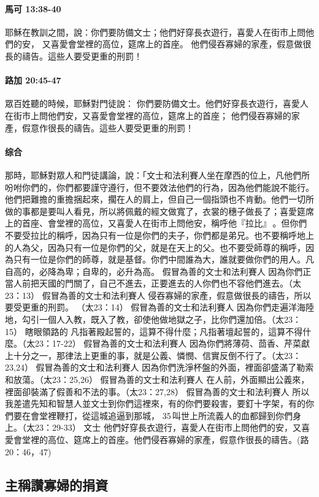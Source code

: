 \paragraph{馬可 13:38-40}
耶穌在教訓之間，說：你們要防備文士；他們好穿長衣遊行，喜愛人在街市上問他們的安，
又喜愛會堂裡的高位，筵席上的首座。
他們侵吞寡婦的家產，假意做很長的禱告。這些人要受更重的刑罰！
\paragraph{路加 20:45-47}
眾百姓聽的時候，耶穌對門徒說：
你們要防備文士。他們好穿長衣遊行，喜愛人在街市上問他們安，又喜愛會堂裡的高位，筵席上的首座；
他們侵吞寡婦的家產，假意作很長的禱告。這些人要受更重的刑罰！
\paragraph{综合}
那時，耶穌對眾人和門徒講論，說：「文士和法利賽人坐在摩西的位上，凡他們所吩咐你們的，你們都要謹守遵行，但不要效法他們的行為，因為他們能說不能行。他們把難擔的重擔捆起來，擱在人的肩上，但自己一個指頭也不肯動。他們一切所做的事都是要叫人看見，所以將佩戴的經文做寬了，衣裳的穗子做長了；喜愛筵席上的首座、會堂裡的高位，又喜愛人在街市上問他安，稱呼他『拉比』 。但你們不要受拉比的稱呼，因為只有一位是你們的夫子，你們都是弟兄。也不要稱呼地上的人為父，因為只有一位是你們的父，就是在天上的父。也不要受師尊的稱呼，因為只有一位是你們的師尊，就是基督。你們中間誰為大，誰就要做你們的用人。凡自高的，必降為卑；自卑的，必升為高。
假冒為善的文士和法利賽人	因為你們正當人前把天國的門關了，自己不進去，正要進去的人你們也不容他們進去。（太23：13）
假冒為善的文士和法利賽人	侵吞寡婦的家產，假意做很長的禱告，所以要受更重的刑罰。  （太23：14）
假冒為善的文士和法利賽人	因為你們走遍洋海陸地，勾引一個人入教，既入了教，卻使他做地獄之子，比你們還加倍。（太23：15）
瞎眼領路的	凡指著殿起誓的，這算不得什麼；凡指著壇起誓的，這算不得什麼。（太23：17-22）
假冒為善的文士和法利賽人	因為你們將薄荷、茴香、芹菜獻上十分之一，那律法上更重的事，就是公義、憐憫、信實反倒不行了。（太23：23,24）
假冒為善的文士和法利賽人	因為你們洗淨杯盤的外面，裡面卻盛滿了勒索和放蕩。（太23：25,26）
假冒為善的文士和法利賽人	在人前，外面顯出公義來，裡面卻裝滿了假善和不法的事。（太23：27,28）
假冒為善的文士和法利賽人	所以我差遣先知和智慧人並文士到你們這裡來，有的你們要殺害，要釘十字架，有的你們要在會堂裡鞭打，從這城追逼到那城， 35 叫世上所流義人的血都歸到你們身上。（太23：29-33）
文士	他們好穿長衣遊行，喜愛人在街市上問他們的安，又喜愛會堂裡的高位、筵席上的首座。他們侵吞寡婦的家產，假意作很長的禱告。(路20：46，47)
\subsection{主稱讚寡婦的捐資}
